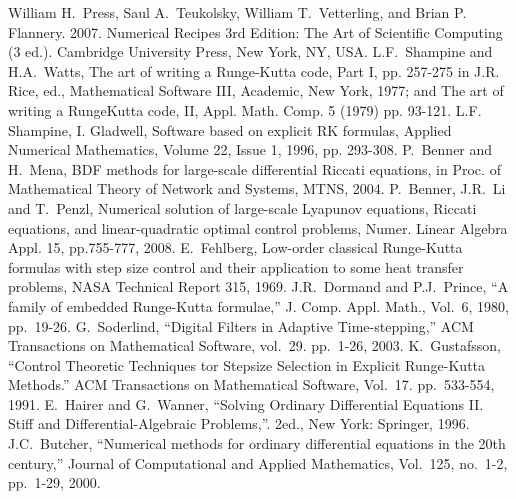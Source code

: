 \documentclass[]{article}
\begin{document}
\begin{thebibliography}{99}
 William H.~Press, Saul A.~Teukolsky, William T.~Vetterling, and Brian P. Flannery. 2007. Numerical Recipes 3rd Edition: The Art of Scientific Computing (3 ed.). Cambridge University Press, New York, NY, USA.
 L.F.~Shampine and H.A.~Watts, The art of writing a Runge-Kutta code, Part I, pp. 257-275 in J.R. Rice, ed., Mathematical Software III, Academic, New York, 1977; and The art of writing a RungeKutta code, II, Appl. Math. Comp. 5 (1979) pp. 93-121.
 L.F. Shampine, I. Gladwell, Software based on explicit RK formulas, Applied Numerical Mathematics, Volume 22, Issue 1, 1996, pp. 293-308.
 P.~Benner and H.~Mena, BDF methods for large-scale differential Riccati equations, in Proc. of Mathematical Theory of Network and Systems, MTNS, 2004.
 P.~Benner, J.R.~Li and T.~Penzl, Numerical solution of large-scale Lyapunov equations, Riccati equations, and linear-quadratic optimal control problems, Numer. Linear Algebra Appl. 15, pp.755-777, 2008.
 E.~Fehlberg, Low-order classical Runge-Kutta formulas with step size control and their application to some heat transfer problems, NASA Technical Report 315, 1969.
 J.R.~Dormand and P.J.~Prince, ``A family of embedded Runge-Kutta formulae,'' J. Comp. Appl. Math., Vol.~6, 1980, pp.~19-26.
 G.~Soderlind, ``Digital Filters in Adaptive Time-stepping,'' ACM Transactions on Mathematical Software, vol.~29. pp.~1-26, 2003.
 K.~Gustafsson, ``Control Theoretic Techniques tor Stepsize Selection in Explicit Runge-Kutta Methods.'' ACM Transactions on Mathematical Software, Vol.~17. pp.~533-554, 1991.
 E.~Hairer and G.~Wanner, ``Solving Ordinary Differential Equations II. Stiff and Differential-Algebraic Problems,''. 2ed., New York: Springer, 1996.
 J.C.~Butcher, ``Numerical methods for ordinary differential equations in the 20th century,'' Journal of Computational and Applied Mathematics, Vol.~125, no.~1-2, pp.~1-29, 2000.
\end{thebibliography}
\end{document}
